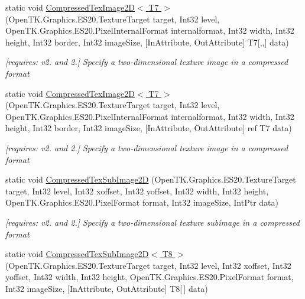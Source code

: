 \begin{DoxyCompactItemize}
static void \hyperlink{class_open_t_k_1_1_graphics_1_1_e_s20_1_1_g_l_a576991ce7c07caf1c170233b89956be0}{Compressed\-Tex\-Image2\-D$<$ T7 $>$} (Open\-T\-K.\-Graphics.\-E\-S20.\-Texture\-Target target, Int32 level, Open\-T\-K.\-Graphics.\-E\-S20.\-Pixel\-Internal\-Format internalformat, Int32 width, Int32 height, Int32 border, Int32 image\-Size, \mbox{[}In\-Attribute, Out\-Attribute\mbox{]} T7\mbox{[},,\mbox{]} data)
\begin{DoxyCompactList}\small\item\em \mbox{[}requires\-: v2. and 2.\mbox{]} Specify a two-\/dimensional texture image in a compressed format \end{DoxyCompactList}\item 
static void \hyperlink{class_open_t_k_1_1_graphics_1_1_e_s20_1_1_g_l_a5897cc8ca5b880dc07cb29f19b07bef5}{Compressed\-Tex\-Image2\-D$<$ T7 $>$} (Open\-T\-K.\-Graphics.\-E\-S20.\-Texture\-Target target, Int32 level, Open\-T\-K.\-Graphics.\-E\-S20.\-Pixel\-Internal\-Format internalformat, Int32 width, Int32 height, Int32 border, Int32 image\-Size, \mbox{[}In\-Attribute, Out\-Attribute\mbox{]} ref T7 data)
\begin{DoxyCompactList}\small\item\em \mbox{[}requires\-: v2. and 2.\mbox{]} Specify a two-\/dimensional texture image in a compressed format \end{DoxyCompactList}\item 
static void \hyperlink{class_open_t_k_1_1_graphics_1_1_e_s20_1_1_g_l_a498ad033c30317ef0325d365771a423e}{Compressed\-Tex\-Sub\-Image2\-D} (Open\-T\-K.\-Graphics.\-E\-S20.\-Texture\-Target target, Int32 level, Int32 xoffset, Int32 yoffset, Int32 width, Int32 height, Open\-T\-K.\-Graphics.\-E\-S20.\-Pixel\-Format format, Int32 image\-Size, Int\-Ptr data)
\begin{DoxyCompactList}\small\item\em \mbox{[}requires\-: v2. and 2.\mbox{]} Specify a two-\/dimensional texture subimage in a compressed format \end{DoxyCompactList}\item 
static void \hyperlink{class_open_t_k_1_1_graphics_1_1_e_s20_1_1_g_l_a8bc414ab4267e5718508e238e5f2365b}{Compressed\-Tex\-Sub\-Image2\-D$<$ T8 $>$} (Open\-T\-K.\-Graphics.\-E\-S20.\-Texture\-Target target, Int32 level, Int32 xoffset, Int32 yoffset, Int32 width, Int32 height, Open\-T\-K.\-Graphics.\-E\-S20.\-Pixel\-Format format, Int32 image\-Size, \mbox{[}In\-Attribute, Out\-Attribute\mbox{]} T8\mbox{[}$\,$\mbox{]} data)

\end{DoxyCompactItemize}

